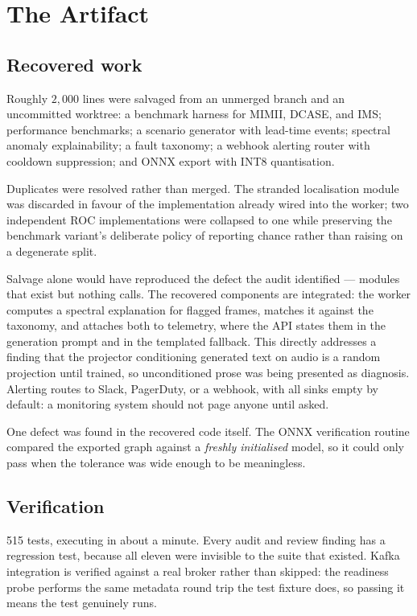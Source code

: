 \documentclass[11pt]{article}
\let\oldsection\section
\renewcommand{\section}{\clearpage\oldsection}
\begin{document}
\section{The Artifact}
\label{sec:artifact}

\subsection{Recovered work}

Roughly $2{,}000$ lines were salvaged from an unmerged branch and an
uncommitted worktree: a benchmark harness for MIMII, DCASE, and IMS; performance
benchmarks; a scenario generator with lead-time events; spectral anomaly
explainability; a fault taxonomy; a webhook alerting router with cooldown
suppression; and ONNX export with INT8 quantisation.

Duplicates were resolved rather than merged. The stranded localisation module
was discarded in favour of the implementation already wired into the worker; two
independent ROC implementations were collapsed to one while preserving the
benchmark variant's deliberate policy of reporting chance rather than raising on
a degenerate split.

Salvage alone would have reproduced the defect the audit identified --- modules
that exist but nothing calls. The recovered components are integrated: the
worker computes a spectral explanation for flagged frames, matches it against
the taxonomy, and attaches both to telemetry, where the API states them in the
generation prompt and in the templated fallback. This directly addresses a
finding that the projector conditioning generated text on audio is a random
projection until trained, so unconditioned prose was being presented as
diagnosis. Alerting routes to Slack, PagerDuty, or a webhook, with all sinks
empty by default: a monitoring system should not page anyone until asked.

One defect was found in the recovered code itself. The ONNX verification
routine compared the exported graph against a \emph{freshly initialised} model,
so it could only pass when the tolerance was wide enough to be meaningless.

\subsection{Verification}

515 tests, executing in about a minute. Every audit and review finding has a regression
test, because all eleven were invisible to the suite that existed. Kafka
integration is verified against a real broker rather than skipped: the readiness
probe performs the same metadata round trip the test fixture does, so passing it
means the test genuinely runs.
\end{document}
